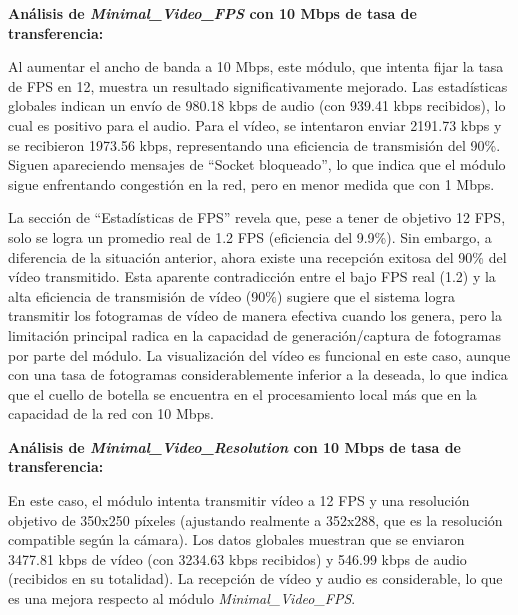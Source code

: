 \vspace{\baselineskip}

\textbf{Análisis de \textit{Minimal\_Video\_FPS} con 10 Mbps de tasa de transferencia:}
\vspace{\baselineskip}

Al aumentar el ancho de banda a 10 Mbps, este módulo, que intenta fijar la tasa de FPS en 12, muestra un resultado significativamente mejorado. Las estadísticas globales indican un envío de 980.18 kbps de audio (con 939.41 kbps recibidos), lo cual es positivo para el audio. Para el vídeo, se intentaron enviar 2191.73 kbps y se recibieron 1973.56 kbps, representando una eficiencia de transmisión del 90\%. Siguen apareciendo mensajes de ``Socket bloqueado'', lo que indica que el módulo sigue enfrentando congestión en la red, pero en menor medida que con 1 Mbps.
\vspace{\baselineskip}

La sección de ``Estadísticas de FPS'' revela que, pese a tener de objetivo 12 FPS, solo se logra un promedio real de 1.2 FPS (eficiencia del 9.9\%). Sin embargo, a diferencia de la situación anterior, ahora existe una recepción exitosa del 90\% del vídeo transmitido. Esta aparente contradicción entre el bajo FPS real (1.2) y la alta eficiencia de transmisión de vídeo (90\%) sugiere que el sistema logra transmitir los fotogramas de vídeo de manera efectiva cuando los genera, pero la limitación principal radica en la capacidad de generación/captura de fotogramas por parte del módulo. La visualización del vídeo es funcional en este caso, aunque con una tasa de fotogramas considerablemente inferior a la deseada, lo que indica que el cuello de botella se encuentra en el procesamiento local más que en la capacidad de la red con 10 Mbps.

\vspace{\baselineskip}

\textbf{Análisis de \textit{Minimal\_Video\_Resolution} con 10 Mbps de tasa de transferencia:}
\vspace{\baselineskip}

En este caso, el módulo intenta transmitir vídeo a 12 FPS y una resolución objetivo de 350x250 píxeles (ajustando realmente a 352x288, que es la resolución compatible según la cámara). Los datos globales muestran que se enviaron 3477.81 kbps de vídeo (con 3234.63 kbps recibidos) y 546.99 kbps de audio (recibidos en su totalidad). La recepción de vídeo y audio es considerable, lo que es una mejora respecto al módulo \textit{Minimal\_Video\_FPS}.
\vspace{\baselineskip}

